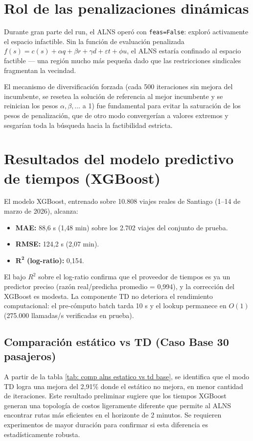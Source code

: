 \section{Rol de las penalizaciones dinámicas}

Durante gran parte del run, el ALNS operó con \texttt{feas=False}: exploró activamente el espacio infactible. Sin la función de evaluación penalizada $f(s) = c(s) + \alpha q + \beta r + \gamma d + \varepsilon t + \phi u$, el ALNS estaría confinado al espacio factible — una región mucho más pequeña dado que las restricciones sindicales fragmentan la vecindad.

El mecanismo de diversificación forzada (cada 500 iteraciones sin mejora del incumbente, se resetea la solución de referencia al mejor incumbente y se reinician los pesos $\alpha, \beta, \ldots$ a 1) fue fundamental para evitar la saturación de los pesos de penalización, que de otro modo convergerían a valores extremos y sesgarían toda la búsqueda hacia la factibilidad estricta.

\section{Resultados del modelo predictivo de tiempos (XGBoost)}

El modelo XGBoost, entrenado sobre 10.808 viajes reales de Santiago (1–14 de marzo de 2026), alcanza:
\begin{itemize}
    \item \textbf{MAE:} 88,6 s (1,48 min) sobre los 2.702 viajes del conjunto de prueba.
    \item \textbf{RMSE:} 124,2 s (2,07 min).
    \item $\mathbf{R^2}$\textbf{ (log-ratio):} 0,154.
\end{itemize}

El bajo $R^2$ sobre el log-ratio confirma que el proveedor de tiempos es ya un predictor preciso (razón real/predicha promedio = 0,994), y la corrección del XGBoost es modesta. La componente TD no deteriora el rendimiento computacional: el pre-cómputo batch tarda 10 s y el lookup permanece en $O(1)$ (275.000 llamadas/s verificadas en prueba).

\subsection{Comparación estático vs TD (Caso Base 30 pasajeros)}



A partir de la tabla \ref{tab: comp alns estatico vs td base}, se identifica que el modo TD logra una mejora del 2,91\% donde el estático no mejora, en menor cantidad de iteraciones. Este resultado preliminar sugiere que los tiempos XGBoost generan una topología de costos ligeramente diferente que permite al ALNS encontrar rutas más eficientes en el horizonte de 2 minutos. Se requieren experimentos de mayor duración para confirmar si esta diferencia es estadísticamente robusta.

